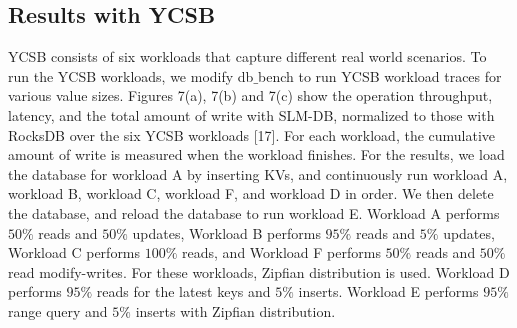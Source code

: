 \subsection{Results with YCSB}
YCSB consists of six workloads that capture different real world scenarios. To run the YCSB workloads, we modify db$\_$bench to run YCSB workload traces for various value sizes. Figures 7(a), 7(b) and 7(c) show the operation throughput, latency, and the total amount of write with SLM-DB, normalized to those with RocksDB over the six YCSB workloads [17]. For each workload, the cumulative amount of write is measured when the workload finishes. For the results, we load the database for workload A by inserting KVs, and continuously run workload A, workload B, workload C, workload F, and workload D in order. We then delete the database, and reload the database to run workload E. Workload A performs $50\%$ reads and $50\%$ updates, Workload B performs $95\%$ reads and $5\%$ updates, Workload C performs $100\%$ reads, and Workload F performs $50\%$ reads and $50\%$ read modify-writes. For these workloads, Zipfian distribution is used. Workload D performs $95\%$ reads for the latest keys and $5\%$ inserts. Workload E performs $95\%$ range query and $5\%$ inserts with Zipfian distribution.
